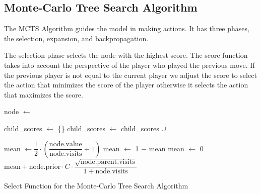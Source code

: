 \subsection{Monte-Carlo Tree Search Algorithm}

The MCTS Algorithm guides the model in making actions. It has three phases, the selection, expansion, and backpropagation.

The selection phase selects the node with the highest score. The score function takes into account the perspective of the player who played the previous move. If the previous player is not equal to the current player we adjust the score to select the action that minimizes the score of the player otherwise it selects the action that maximizes the score. 

\begin{algorithm}[htb]
    \begin{algorithmic}[1]
                \State node $\gets$ 
            \EndWhile
        \EndFunction
        
            \State child\_scores $\gets$ \{\}
                \State child\_scores $\gets$ child\_scores $\cup$ 
            \EndFor
            \Return {}
        \EndFunction
        
                \State mean $\gets \dfrac{1}{2}\cdot\left(\dfrac{ \text{node.value} }{ \text{node.visits} } + 1\right)$
                    \State mean $\gets$ 1 $-$ mean
                \EndIf
            \Else
                \State mean $\gets$ 0
            \EndIf
            \State \Return $\text{mean} + \text{node.prior} \cdot C \cdot \dfrac{\sqrt{\text{node.parent.visits}}}{1 + \text{node.visits}}$  
        \EndFunction
    \end{algorithmic}
    \caption{Select Function for the Monte-Carlo Tree Search Algorithm}
    \label{alg:select}
\end{algorithm}

